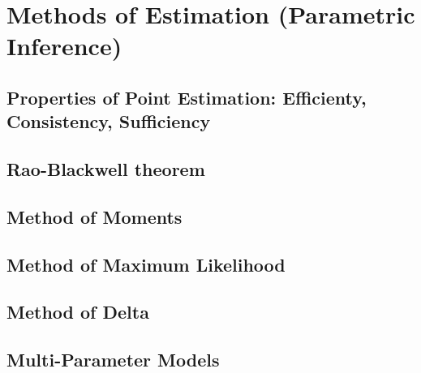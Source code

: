 \chapter{Methods of Estimation (Parametric Inference)}
\section{Properties of Point Estimation: Efficienty, Consistency, Sufficiency}
\section{Rao-Blackwell theorem}
\section{Method of Moments}
\section{Method of Maximum Likelihood}
\section{Method of Delta}
\section{Multi-Parameter Models}

